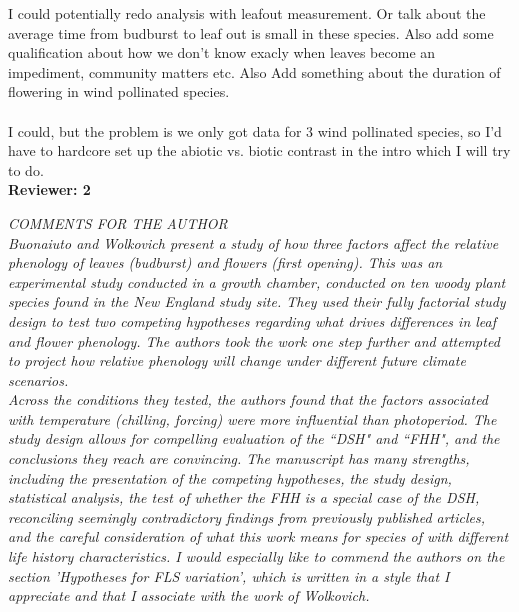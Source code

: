 \documentclass[11pt]{article}
\begin{document}
I could potentially redo analysis with leafout measurement. Or talk about the average time from budburst to leaf out is small in these species. Also add some qualification about how we don't know exacly when leaves become an impediment, community matters etc. Also Add something about the duration of flowering in wind pollinated species.\\

\\

I could, but the problem is we only got data for 3 wind pollinated species, so I'd have to hardcore set up the abiotic vs. biotic contrast in the intro which I will try to do.\\

\textbf{Reviewer: 2}

\emph{COMMENTS FOR THE AUTHOR}\\
\emph{Buonaiuto and Wolkovich present a study of how three factors affect the relative phenology of leaves (budburst) and flowers (first opening).  This was an experimental study conducted in a growth chamber, conducted on ten woody plant species found in the New England study site. They used their fully factorial study design to test two competing hypotheses regarding what drives differences in leaf and flower phenology. The authors took the work one step further and attempted to project how relative phenology will change under different future climate scenarios.\\

Across the conditions they tested, the authors found that the factors associated with temperature (chilling, forcing) were more influential than photoperiod. The study design allows for compelling evaluation of the ``DSH" and ``FHH", and the conclusions they reach are convincing. The manuscript has many strengths, including the presentation of the competing hypotheses, the study design, statistical analysis, the test of whether the FHH is a special case of the DSH, reconciling seemingly contradictory findings from previously published articles, and the careful consideration of what this work means for species of with different life history characteristics. I would especially like to commend the authors on the section 'Hypotheses for FLS variation', which is written in a style that I appreciate and that I associate with the work of Wolkovich.}\\
\end{document}
